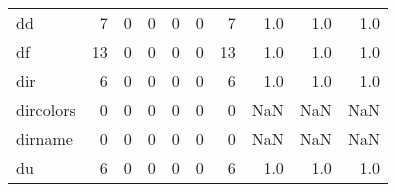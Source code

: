 \begin{longtable}{lrrrrrrrrr}
dd        &                                       7 &                                                  0 &                                                  0 &                                                  0 &                                                  0 &                                                  7 &                                                1.0 &                                    1.0 &                                  1.0 \\
df        &                                      13 &                                                  0 &                                                  0 &                                                  0 &                                                  0 &                                                 13 &                                                1.0 &                                    1.0 &                                  1.0 \\
dir       &                                       6 &                                                  0 &                                                  0 &                                                  0 &                                                  0 &                                                  6 &                                                1.0 &                                    1.0 &                                  1.0 \\
dircolors &                                       0 &                                                  0 &                                                  0 &                                                  0 &                                                  0 &                                                  0 &                                                NaN &                                    NaN &                                  NaN \\
dirname   &                                       0 &                                                  0 &                                                  0 &                                                  0 &                                                  0 &                                                  0 &                                                NaN &                                    NaN &                                  NaN \\
du        &                                       6 &                                                  0 &                                                  0 &                                                  0 &                                                  0 &                                                  6 &                                                1.0 &                                    1.0 &                                  1.0 \\

\end{longtable}

